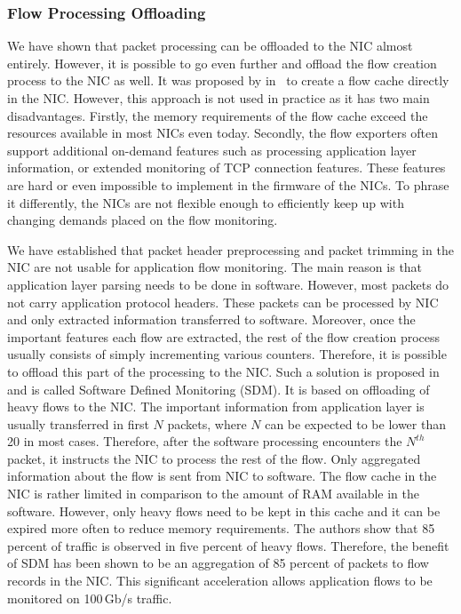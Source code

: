 \subsubsection{Flow Processing Offloading}
We have shown that packet processing can be offloaded to the NIC almost entirely. However, it is possible to go even further and offload the flow creation process to the NIC as well. It was proposed by \citeauthor{Zadnik-2008-Network} in~\cite{Zadnik-2008-Network} to create a flow cache directly in the NIC. However, this approach is not used in practice as it has two main disadvantages. Firstly, the memory requirements of the flow cache exceed the resources available in most NICs even today. Secondly, the flow exporters often support additional on-demand features such as processing application layer information, or extended monitoring of TCP connection features. These features are hard or even impossible to implement in the firmware of the NICs. To phrase it differently, the NICs are not flexible enough to efficiently keep up with changing demands placed on the flow monitoring.


We have established that packet header preprocessing and packet trimming in the NIC are not usable for application flow monitoring. The main reason is that application layer parsing needs to be done in software. However, most packets do not carry application protocol headers. These packets can be processed by NIC and only extracted information transferred to software. Moreover, once the important features each flow are extracted, the rest of the flow creation process usually consists of simply incrementing various counters. Therefore, it is possible to offload this part of the processing to the NIC. Such a solution is proposed in~\cite{Kekely-2016-Software} and is called Software Defined Monitoring (SDM). It is based on offloading of heavy flows to the NIC. The important information from application layer is usually transferred in first $N$ packets, where $N$ can be expected to be lower than 20 in most cases. Therefore, after the software processing encounters the $N^{th}$ packet, it instructs the NIC to process the rest of the flow. Only aggregated information about the flow is sent from NIC to software. The flow cache in the NIC is rather limited in comparison to the amount of RAM available in the software. However, only heavy flows need to be kept in this cache and it can be expired more often to reduce memory requirements. The authors show that 85 percent of traffic is observed in five percent of heavy flows. Therefore, the benefit of SDM has been shown to be an aggregation of 85 percent of packets to flow records in the NIC. This significant acceleration allows application flows to be monitored on 100\,Gb/s traffic.

